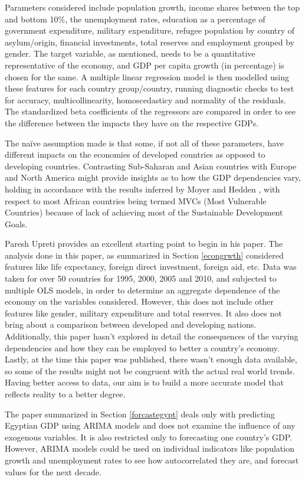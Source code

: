 \documentclass[conference]{IEEEtran}
\begin{document}
Parameters considered include population growth, income shares between the top and bottom 10\%, the unemployment rates, education as a percentage of government expenditure, military expenditure, refugee population by country of asylum/origin, financial investments, total reserves and employment grouped by gender. The target variable, as mentioned, needs to be a quantitative representative of the economy, and GDP per capita growth (in percentage) is chosen for the same. A multiple linear regression model is then modelled using these features for each country group/country, running diagnostic checks to test for accuracy, multicollinearity, homoscedasticy and normality of the residuals. The standardized beta coefficients of the regressors are compared in order to see the difference between the impacts they have on the respective GDPs. 

The na\"{i}ve assumption made is that some, if not all of these parameters, have different impacts on the economies of developed countries as opposed to developing countries. Contrasting Sub-Saharan and Asian countries with Europe and North America might provide insights as to how the GDP dependencies vary, holding in accordance with the results inferred by Moyer and Hedden \cite{SDG}, with respect to most African countries being termed MVCs (Most Vulnerable Countries) because of lack of achieving most of the Sustainable Development Goals.

Paresh Upreti\cite{econgrowth} provides an excellent starting point to begin in his paper. The analysis done in this paper, as summarized in Section \ref{econgrwth} considered features like life expectancy, foreign direct investment, foreign aid, etc. Data was taken for over 50 countries for 1995, 2000, 2005 and 2010, and subjected to multiple OLS models, in order to determine an aggregate dependence of the economy on the variables considered. However, this does not include other features like gender, military expenditure and total reserves. It also does not bring about a comparison between developed and developing nations. Additionally, this paper hasn’t explored in detail the consequences of the varying dependencies and how they can be employed to better a country’s economy. Lastly, at the time this paper was published, there wasn’t enough data available, so some of the results might not be congruent with the actual real world trends. Having better access to data, our aim is to build a more accurate model that reflects reality to a better degree.

The paper\cite{forecastegypt} summarized in Section \ref{forcastegypt} deals only with predicting Egyptian GDP using ARIMA models and does not examine the influence of any exogenous variables. It is also restricted only to forecasting one country's GDP. However, ARIMA models could be used on individual indicators like population growth and unemployment rates to see how autocorrelated they are, and forecast values for the next decade. 
\end{document}

